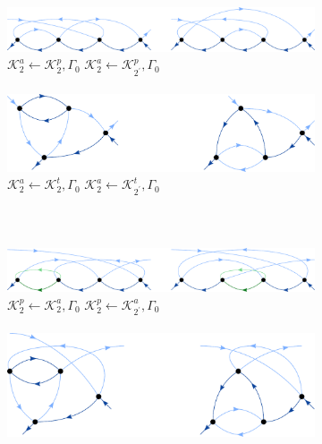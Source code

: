 \documentclass[10pt]{scrartcl}
\newcommand{\K}[2]{\mathcal{K}_#1^#2}
\newcommand{\Kb}[2]{\mathcal{K}_{#1^\prime}^{#2}}
\begin{document}
\begin{figure}[h!]
\begin{subfigure}[c]{0.4\textwidth}
\includegraphics[scale=0.3]{diagrams/PT4_K2a_2d_p}
\\
\phantom{.}\hspace{0.45cm} $\K2a \leftarrow \K2p, \Gamma_0$ \hspace{1.1cm} $\K2a \leftarrow \Kb2p, \Gamma_0$
\\ \\
\phantom{.}\hspace{0.4cm}
\includegraphics[scale=0.3]{diagrams/PT4_K2a_2d_t}
\\
\phantom{.}\hspace{0.45cm} $\K2a \leftarrow \K2t, \Gamma_0$ \hspace{1.1cm} $\K2a \leftarrow \Kb2t, \Gamma_0$
\\ \\
\\ \\
\includegraphics[scale=0.3]{diagrams/PT4_K2p_2d_a}
\\
\phantom{.}\hspace{0.45cm} $\K2p \leftarrow \K2a, \Gamma_0$ \hspace{1.1cm} $\K2p \leftarrow \Kb2a, \Gamma_0$
\\ \\
\phantom{.}\hspace{0.45cm}
\includegraphics[scale=0.3]{diagrams/PT4_K2p_2d_t}

\end{subfigure}
\end{figure}
\end{document}
